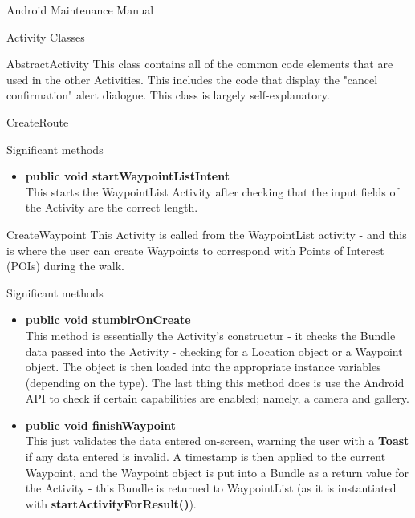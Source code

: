 \documentclass{article}
\begin{document}
\begin{section}{Android Maintenance Manual}
	\begin{subsection}{Activity Classes}
		\begin{subsubsection}{AbstractActivity}
			This class contains all of the common code elements that are used in the other Activities. This includes the code that display the "cancel confirmation" alert dialogue. This class is largely self-explanatory.
		\end{subsubsection}
		
		\begin{subsubsection}{CreateRoute}
			\begin{paragraph}{Significant methods}
				\begin{itemize}
					\item{{\bf public void startWaypointListIntent} \\
					This starts the WaypointList Activity after checking that the input fields of the Activity are the correct length.}
				\end{itemize}
			\end{paragraph}
		\end{subsubsection}
		
		\begin{subsubsection}{CreateWaypoint}
			This Activity is called from the WaypointList activity - and this is where the user can create Waypoints to correspond with Points of Interest (POIs) during the walk.
			\begin{paragraph}{Significant methods}
				\begin{itemize}
					\item{{\bf public void stumblrOnCreate} \\
					This method is essentially the Activity's constructur - it checks the Bundle data passed into the Activity - checking for a Location object or a Waypoint object. The object is then loaded into the appropriate instance variables (depending on the type). The last thing this method does is use the Android API to check if certain capabilities are enabled; namely, a camera and gallery.}
					
					\item{{\bf public void finishWaypoint} \\
					This just validates the data entered on-screen, warning the user with a {\bf Toast} if any data entered is invalid. A timestamp is then applied to the current Waypoint, and the Waypoint object is put into a Bundle as a return value for the Activity - this Bundle is returned to WaypointList (as it is instantiated with {\bf startActivityForResult()}).}
					

\end{itemize}
\end{paragraph}
\end{subsubsection}
\end{subsection}
\end{section}
\end{document}

